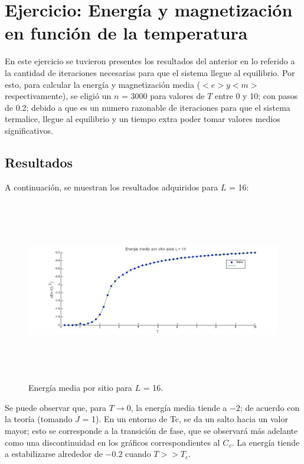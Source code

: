 \documentclass[a4paper,12pt]{article}
\begin{document}
\section{Ejercicio: Energ\'ia y magnetizaci\'on en funci\'on de la temperatura}

En este ejercicio se tuvieron presentes los resultados del anterior en lo referido a la cantidad de iteraciones necesarias para que el sistema llegue al equilibrio. Por esto, para calcular la energ\'ia y magnetizaci\'on media ($<e> y <m>$ respectivamente), se eligi\'o un $n$ = 3000 para valores de $T$ entre 0 y 10; con pasos de 0.2; debido a que es un numero razonable de iteraciones para que el sistema termalice, llegue al equilibrio y un tiempo extra poder tomar valores medios significativos.

\subsection{Resultados}

A continuaci\'on, se muestran los resultados adquiridos para $L$ = 16:

\begin{figure}[H]
\begin{center}
\includegraphics[height=8cm,width=20cm]{../graficos/Emean_L16.jpg}
\caption[width=5cm]{Energ\'ia media por sitio para $L$ = 16.}
\end{center}
\end{figure}

Se puede observar que, para $T \rightarrow 0$, la energ\'ia media tiende a $-2$; de acuerdo con la teor\'ia (tomando $J$ = 1). En un entorno de Tc, se da un salto hacia un valor mayor; esto se corresponde a la transici\'on de fase, que se observar\'a m\'as adelante como una discontinuidad en los gr\'aficos correspondientes al $C_{v}$. La energ\'ia tiende a estabilizarse alrededor de $-0.2$ cuando $T >> T_{c}$.
\end{document}

